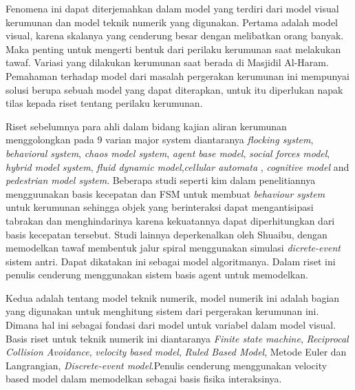 \hspace{0.6cm}Fenomena ini dapat diterjemahkan dalam model yang terdiri dari model visual kerumunan dan model teknik numerik yang digunakan. Pertama adalah model visual, karena skalanya yang cenderung besar dengan melibatkan orang banyak. Maka penting untuk mengerti bentuk dari perilaku kerumunan saat melakukan tawaf. Variasi yang dilakukan kerumunan saat berada di Masjidil Al-Haram. Pemahaman terhadap model dari masalah pergerakan kerumunan ini mempunyai solusi berupa sebuah model yang dapat diterapkan, untuk itu diperlukan napak tilas kepada riset tentang perilaku kerumunan. 

\hspace{0.6cm}Riset sebelumnya para ahli dalam bidang kajian aliran kerumunan menggolongkan pada 9 varian major system diantaranya \emph{flocking system}, \emph{behavioral system}, \emph{chaos model system}\citep{Saiwaki1997}, \emph{agent base model}\citep{Khan2012}, \emph{social forces model}\citep{Zainuddin2009}, \emph{hybrid model system}\citep{Shuaibu2015}, \emph{fluid dynamic model}\citep{Narain2009},\emph{cellular automata} \citep{Lim2012}, \emph{cognitive model}\citep{Mulyana2010} and \emph{pedestrian model system}\citep{Adnan2013}. Beberapa studi seperti kim dalam penelitiannya mengguunakan basis kecepatan dan FSM untuk membuat \emph{behaviour system} untuk kerumunan sehingga objek yang berinteraksi dapat mengantisipasi tabrakan dan menghindarinya karena kekuatannya dapat diperhitungkan dari basis kecepatan tersebut\citep{Kim2014}. Studi lainnya deperkenalkan oleh Shuaibu, dengan memodelkan tawaf membentuk jalur spiral menggunakan simulasi \emph{dicrete-event} sistem antri\citep{Shuaibu2015}. Dapat dikatakan ini sebagai model algoritmanya. Dalam riset ini penulis cenderung menggunakan sistem basis agent untuk memodelkan.

\hspace{0.6cm}Kedua adalah tentang model teknik numerik, model numerik ini adalah bagian yang digunakan untuk menghitung sistem dari pergerakan kerumunan ini. 
Dimana hal ini sebagai fondasi dari model untuk variabel dalam model visual. Basis riset untuk teknik numerik ini diantaranya \emph{Finite state machine}\citep{Curtis2011}\citep{Bicho2012},  \emph{Reciprocal Collision Avoidance}, \emph{velocity based model}\citep{Kim2014}, \emph{Ruled Based Model}, Metode Euler dan Langrangian\citep{Narain2009}, \emph{Discrete-event model}.Penulis cenderung menggunakan velocity based model dalam memodelkan sebagai basis fisika interaksinya. %


